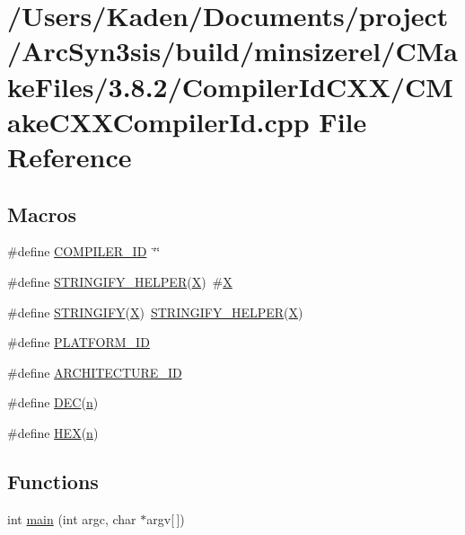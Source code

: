 \hypertarget{a00792}{}\section{/\+Users/\+Kaden/\+Documents/project/\+Arc\+Syn3sis/build/minsizerel/\+C\+Make\+Files/3.8.2/\+Compiler\+Id\+C\+X\+X/\+C\+Make\+C\+X\+X\+Compiler\+Id.cpp File Reference}
\label{a00792}
\subsection*{Macros}
\begin{DoxyCompactItemize}
\item 
\#define \hyperlink{a00792_a81dee0709ded976b2e0319239f72d174}{C\+O\+M\+P\+I\+L\+E\+R\+\_\+\+ID}~\char`\"{}\char`\"{}
\item 
\#define \hyperlink{a00792_a2ae9b72bb13abaabfcf2ee0ba7d3fa1d}{S\+T\+R\+I\+N\+G\+I\+F\+Y\+\_\+\+H\+E\+L\+P\+ER}(\hyperlink{a00611_a708712aede48a739e9ae0c42413ef460}{X})~\#\hyperlink{a00611_a708712aede48a739e9ae0c42413ef460}{X}
\item 
\#define \hyperlink{a00792_a43e1cad902b6477bec893cb6430bd6c8}{S\+T\+R\+I\+N\+G\+I\+FY}(\hyperlink{a00611_a708712aede48a739e9ae0c42413ef460}{X})~\hyperlink{a00801_a2ae9b72bb13abaabfcf2ee0ba7d3fa1d}{S\+T\+R\+I\+N\+G\+I\+F\+Y\+\_\+\+H\+E\+L\+P\+ER}(\hyperlink{a00611_a708712aede48a739e9ae0c42413ef460}{X})
\item 
\#define \hyperlink{a00792_adbc5372f40838899018fadbc89bd588b}{P\+L\+A\+T\+F\+O\+R\+M\+\_\+\+ID}
\item 
\#define \hyperlink{a00792_aba35d0d200deaeb06aee95ca297acb28}{A\+R\+C\+H\+I\+T\+E\+C\+T\+U\+R\+E\+\_\+\+ID}
\item 
\#define \hyperlink{a00792_ad1280362da42492bbc11aa78cbf776ad}{D\+EC}(\hyperlink{a00623_a781a04ab095280f838ff3eb0e51312e0}{n})
\item 
\#define \hyperlink{a00792_a46d5d95daa1bef867bd0179594310ed5}{H\+EX}(\hyperlink{a00623_a781a04ab095280f838ff3eb0e51312e0}{n})
\end{DoxyCompactItemize}
\subsection*{Functions}
\begin{DoxyCompactItemize}
\item 
int \hyperlink{a00792_a0ddf1224851353fc92bfbff6f499fa97}{main} (int argc, char $\ast$argv\mbox{[}$\,$\mbox{]})
\end{DoxyCompactItemize}
